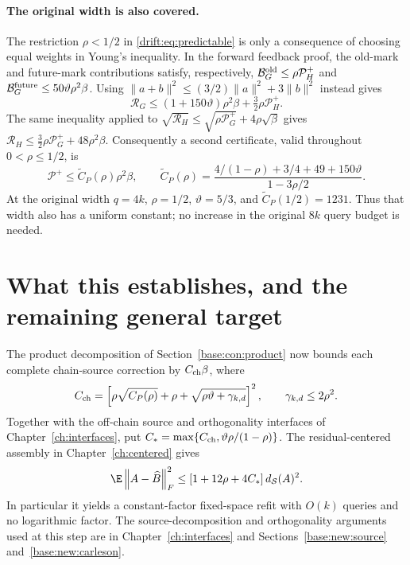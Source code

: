 \documentclass[11pt,oneside,openany,a4paper]{book}
\numberwithin{equation}{chapter}
\theoremstyle{definition}
\theoremstyle{remark}
\newcommand{\F}[1]{\left\lVert#1\right\rVert_F}
\begin{document}
\paragraph{The original width is also covered.}
The restriction $\rho<1/2$ in \eqref{drift:eq:predictable} is only a consequence
of choosing equal weights in Young's inequality. In the forward feedback
proof, the old-mark and future-mark contributions satisfy, respectively,
$\mathcal B_G^{\rm old}\le\rho\mathcal P_H^+$ and
$\mathcal B_G^{\rm future}\le50\vartheta\rho^2\beta$.
Using $\|a+b\|^2\le(3/2)\|a\|^2+3\|b\|^2$ instead gives
\[
 \mathcal R_G\le(1+150\vartheta)\rho^2\beta
                         +\tfrac32\rho\mathcal P_H^+.
\]
The same inequality applied to
$\sqrt{\mathcal R_H}\le\sqrt{\rho\mathcal P_G^+}+4\rho\sqrt\beta$
gives $\mathcal R_H\le\tfrac32\rho\mathcal P_G^++48\rho^2\beta$.
Consequently a second certificate, valid throughout $0<\rho\le1/2$, is
\begin{equation}\label{drift:eq:originalwidth}
 \boxed{\mathcal P^+\le\widetilde C_P(\rho)\rho^2\beta,\qquad
 \widetilde C_P(\rho)=
 \frac{4/(1-\rho)+3/4+49+150\vartheta}{1-3\rho/2}.}
\end{equation}
At the original width $q=4k$, $\rho=1/2$, $\vartheta=5/3$, and
$\widetilde C_P(1/2)=1231$. Thus that width also has a uniform constant;
no increase in the original $8k$ query budget is needed.

\section{What this establishes, and the remaining general target}

The product decomposition of Section~\ref{base:con:product} now bounds each complete chain-source
correction by $C_{\rm ch}\beta$, where
\[
 C_{\rm ch}=\left[\rho\sqrt{C_P(\rho)}+\rho
                       +\sqrt{\rho\vartheta+\gamma_{k,d}}\right]^2,
 \qquad \gamma_{k,d}\le2\rho^2.
\]
Together with the off-chain source and orthogonality interfaces of Chapter~\ref{ch:interfaces},
put $C_* =\max\{C_{\rm ch},\vartheta\rho/(1-\rho)\}$.
The residual-centered assembly in Chapter~\ref{ch:centered} gives
\begin{equation}\label{drift:eq:refit}
 \E\F{A-\widehat B}^2
 \le[1+12\rho+4C_*]\,d_{\mathcal S}(A)^2.
\end{equation}
In particular it yields a constant-factor fixed-space refit with
$O(k)$ queries and no logarithmic factor. The source-decomposition and orthogonality arguments used at this step are in Chapter~\ref{ch:interfaces} and Sections~\ref{base:new:source} and~\ref{base:new:carleson}.
\end{document}

